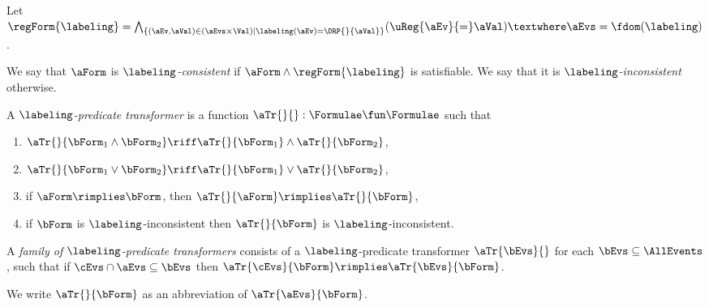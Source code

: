\begin{definition}  
  \label{def:labeling:consistent}
  Let 
  \begin{math}
    \regForm{\labeling}=
    \textstyle\bigwedge_{\{(\aEv,\aVal)\in(\aEvs\times\Val)\mid\labeling(\aEv)=\DRP{}{\aVal}\}}(\uReg{\aEv}{=}\aVal)
    \textwhere \aEvs=\fdom(\labeling)
  \end{math}.
  
  We say that $\aForm$ is \emph{$\labeling$-consistent} if $\aForm\land\regForm{\labeling}$ is satisfiable.
  We say that it is \emph{$\labeling$-inconsistent} otherwise.
\end{definition}

\begin{definition}
  \label{def:trans}
  A \emph{$\labeling$-predicate transformer} is a %
  function
  $\aTr{}{}:\Formulae\fun\Formulae$ such that
  \begin{multicols}{2}
    \begin{enumerate}[,label=(\textsc{x}\arabic*),ref=\textsc{x}\arabic*]
    \item \label{tr-and}
      $\aTr{}{\bForm_1\land\bForm_2}\riff\aTr{}{\bForm_1}\land\aTr{}{\bForm_2}$,    
    \item \label{tr-or}
      $\aTr{}{\bForm_1\lor\bForm_2}\riff\aTr{}{\bForm_1}\lor\aTr{}{\bForm_2}$,
    \item \label{tr-implies}
      if $\aForm \rimplies \bForm$, then $\aTr{}{\aForm} \rimplies
      \aTr{}{\bForm}$,
    \item \label{tr-false}
      if $\bForm$ is $\labeling$-inconsistent then $\aTr{}{\bForm}$ is $\labeling$-inconsistent.
    \end{enumerate}
  \end{multicols}
\end{definition}

\begin{definition}
  \label{def:family}
  A \emph{family of $\labeling$-predicate transformers} consists
  of a $\labeling$-predicate transformer $\aTr{\bEvs}{}$ for each
  $\bEvs\subseteq\AllEvents$, such that if $\cEvs \cap \aEvs \subseteq \bEvs$
  then $\aTr{\cEvs}{\bForm} \rimplies \aTr{\bEvs}{\bForm}$.

  We write $\aTr{}{\bForm}$ as an abbreviation of $\aTr{\aEvs}{\bForm}$.
\end{definition}

